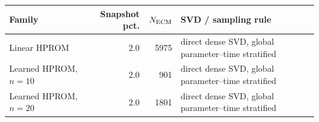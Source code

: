 \begin{tabular}{lrrl}
\toprule
Family & Snapshot pct. & $N_{\rm ECM}$ & SVD / sampling rule \\
\midrule
Linear HPROM & 2.0 & 5975 & direct dense SVD, global parameter--time stratified \\
Learned HPROM, $n=10$ & 2.0 & 901 & direct dense SVD, global parameter--time stratified \\
Learned HPROM, $n=20$ & 2.0 & 1801 & direct dense SVD, global parameter--time stratified \\
\bottomrule
\end{tabular}
